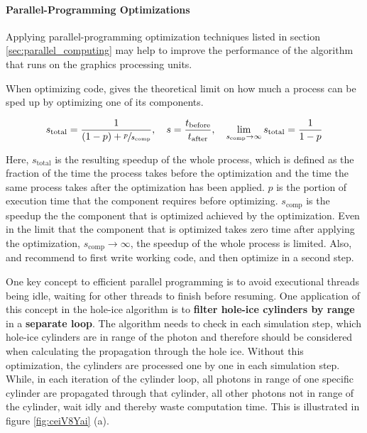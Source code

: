 \paragraph{Parallel-Programming Optimizations}

Applying parallel-programming optimization techniques listed in section
\ref{sec:parallel_computing} may help to improve the performance of the
algorithm that runs on the graphics processing units.

When optimizing code,  gives the theoretical limit on
how much a process can be sped up by optimizing one of its components.
\cite{raytracingtips}

\[ s_\text{total} = \frac{1}{(1 - p) + \sfrac{p}{s_\text{comp}}}, \ \ \ s = \frac{t_\text{before}}{t_\text{after}}, \ \ \
\lim_{s_\text{comp}\rightarrow\infty} s_\text{total} = \frac{1}{1-p} \]

Here, \(s_\text{total}\) is the resulting speedup of the whole process,
which is defined as the fraction of the time the process takes before
the optimization and the time the same process takes after the
optimization has been applied. \(p\) is the portion of execution time
that the component requires before optimizing. \(s_\text{comp}\) is the
speedup the the component that is optimized achieved by the
optimization. Even in the limit that the component that is optimized
takes zero time after applying the optimization,
\(s_\text{comp}\rightarrow\infty\), the speedup of the whole process is
limited. Also, \authorname{House} and \authorname{Wyman}
\cite{raytracingtips} recommend to first write working code, and then
optimize in a second step.

One key concept to efficient parallel programming is to avoid
executional threads being idle, waiting for other threads to finish
before resuming. One application of this concept in the hole-ice
algorithm is to \textbf{filter hole-ice cylinders by range} in a
\textbf{separate loop}. The algorithm needs to check in each simulation
step, which hole-ice cylinders are in range of the photon and therefore
should be considered when calculating the propagation through the hole
ice. Without this optimization, the cylinders are processed one by one
in each simulation step. While, in each iteration of the cylinder loop,
all photons in range of one specific cylinder are propagated through
that cylinder, all other photons not in range of the cylinder, wait idly
and thereby waste computation time. This is illustrated in figure
\ref{fig:ceiV8Yai} (a).

